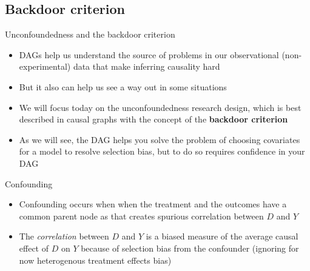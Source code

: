 \documentclass{beamer}
\begin{document}


\subsection{Backdoor criterion}

\begin{frame}{Unconfoundedness and the backdoor criterion}

  \begin{itemize}

    \item DAGs help us understand the source of problems in our observational (non-experimental) data that make inferring causality hard
    \item But it also can help us see a way out in some situations
    \item We will focus today on the unconfoundedness research design, which is best described in causal graphs with the concept of the \textbf{backdoor criterion}
    \item As we will see, the DAG helps you solve the problem of choosing covariates for a model to resolve selection bias, but to do so requires confidence in your DAG
  \end{itemize}

\end{frame}

\begin{frame}{Confounding}

  \begin{itemize}
    \item Confounding occurs when when the treatment and the outcomes have a common parent node as that creates spurious correlation between $D$ and $Y$

          \begin{center}
          \end{center}

          \item The \emph{correlation} between $D$ and $Y$ is a biased measure of the average causal effect of $D$ on $Y$ because of selection bias from the confounder (ignoring for now heterogenous treatment effects bias)
  \end{itemize}
\end{frame}
\end{document}
